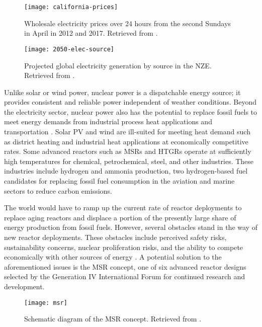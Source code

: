 \begin{figure}[htb!]
	\centering
	\texttt{[image: california-prices]}
	\caption{Wholesale electricity prices over 24 hours from the second Sundays
	in April in 2012 and 2017. Retrieved from \cite{forsberg_market_2020}.}
	\label{fig:cali-prices}
\end{figure}

\begin{figure}[htb!]
	\centering
	\texttt{[image: 2050-elec-source]}
	\caption{Projected global electricity generation by source in the
	\gls{NZE}. Retrieved from \cite{iea_net_2021}.}
	\label{fig:2050-elec-source}
\end{figure}

Unlike solar or wind power, nuclear power is a dispatchable energy source; it
provides consistent and reliable power independent of weather conditions.
Beyond the electricity sector, nuclear power also has the potential to replace
fossil fuels to meet energy demands from industrial process heat applications
and transportation \cite{forsberg_market_2020}. Solar \gls{PV} and
wind are ill-suited for meeting heat demand such as district heating and
industrial heat applications at economically competitive rates. Some advanced
reactors such as \glspl{MSR} and \glspl{HTGR} operate at sufficiently
high temperatures for chemical, petrochemical, steel, and other industries.
These industries include hydrogen and ammonia production, two hydrogen-based
fuel candidates for replacing fossil fuel consumption in the aviation and
marine sectors to reduce carbon emissions.



The world would have to ramp up the current rate of reactor deployments to
replace aging reactors and displace a portion of the presently large share of
energy production from fossil fuels. However, several obstacles stand in the
way of new reactor deployments. These obstacles include perceived
safety risks, sustainability concerns, nuclear proliferation
risks, and the ability to compete economically with other sources of energy
\cite{massachusetts_institute_of_technology_future_2003}. A potential solution
to the aforementioned issues is the \gls{MSR} concept, one of six advanced
reactor designs selected by the Generation IV International Forum
\cite{gif_technology_2002} for continued research and development.

\begin{figure}[htb!]
	\centering
	\texttt{[image: msr]}
	\caption{Schematic diagram of the \gls{MSR} concept. Retrieved from
	\cite{doe_technology_2002}.}
	\label{fig:msr}
\end{figure}

